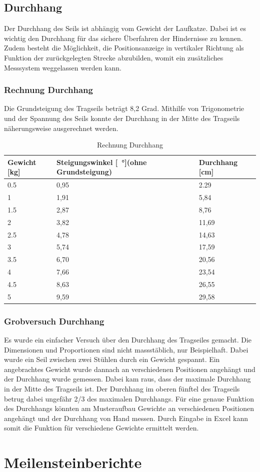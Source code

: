 \documentclass[a4paper]{report}
\begin{document}
\section{Durchhang}
\label{app:sec:Durchhang}
Der Durchhang des Seils ist abhängig vom Gewicht der Laufkatze. Dabei ist es wichtig den Durchhang für das sichere Überfahren der Hindernisse zu kennen. Zudem besteht die Möglichkeit, die Positionsanzeige in vertikaler Richtung als Funktion der zurückgelegten Strecke abzubilden, womit ein zusätzliches Messsystem weggelassen werden kann.

\subsection{Rechnung Durchhang}
\label{ssec:RechDurch}
Die Grundsteigung des Tragseils beträgt 8,2 Grad. Mithilfe von Trigonometrie und der Spannung des Seils konnte der Durchhang in der Mitte des Tragseils näherungsweise ausgerechnet werden.

\vspace{1em}
\noindent
\begin{table}[h!]
	\begin{tabular}{|p{}|p{}|p{}|}
		\hline
		\textbf{Gewicht [kg]} & \textbf{Steigungswinkel [\SI{}{\degree}](ohne Grundsteigung)} &\textbf{Durchhang [cm]}\\
		\hline
		0.5&0,95&2.29\\
		\hline
		1&1,91&5,84\\
		\hline
		1.5&2,87&8,76\\
		\hline
		2&3,82&11,69\\
		\hline
		2.5&4,78&14,63\\
		\hline
		3&5,74&17,59\\
		\hline
		3.5&6,70&20,56\\
		\hline
		4&7,66&23,54\\
		\hline
		4.5&8,63&26,55\\
		\hline
		5&9,59&29,58\\
		\hline
	\end{tabular}
	\caption{Rechnung Durchhang}
	\label{tbl:DurchhangRechnung}
\end{table}


\subsection{Grobversuch Durchhang}
\label{app:ssec:GrobeversDurch}
Es wurde ein einfacher Versuch über den Durchhang des Tragseiles gemacht. Die Dimensionen und Proportionen sind nicht massstäblich, nur Beispielhaft. Dabei wurde ein Seil zwischen zwei Stühlen durch ein Gewicht gespannt. Ein angebrachtes Gewicht wurde dannach an verschiedenen Positionen angehängt und der Durchhang wurde gemessen. Dabei kam raus, dass der maximale Durchhang in der Mitte des Tragseils ist. Der Durchhang im oberen fünftel des Tragseils betrug dabei ungefähr 2/3 des maximalen Durchhangs.
Für eine genaue Funktion des Durchhangs könnten am Musteraufbau Gewichte an verschiedenen Positionen angehängt und der Durchhang von Hand messen. Durch Eingabe in Excel kann somit die Funktion für verschiedene Gewichte ermittelt werden.

\chapter{Meilensteinberichte}
\label{app:ch:MeilensteinBerichte}
\end{document}
